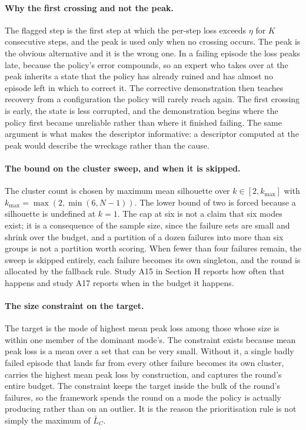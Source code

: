 \documentclass[letterpaper]{article}
\begin{document}
\paragraph{Why the first crossing and not the peak.} The flagged step is the first step
at which the per-step loss exceeds $\eta$ for $K$ consecutive steps, and the peak is
used only when no crossing occurs. The peak is the obvious alternative and it is the
wrong one. In a failing episode the loss peaks late, because the policy's error
compounds, so an expert who takes over at the peak inherits a state that the policy has
already ruined and has almost no episode left in which to correct it. The corrective
demonstration then teaches recovery from a configuration the policy will rarely reach
again. The first crossing is early, the state is less corrupted, and the demonstration
begins where the policy first became unreliable rather than where it finished failing.
The same argument is what makes the descriptor informative: a descriptor computed at
the peak would describe the wreckage rather than the cause.

\paragraph{The bound on the cluster sweep, and when it is skipped.} The cluster count is chosen
by maximum mean silhouette over $k \in [2, k_{\max}]$ with
$k_{\max} = \max(2, \min(6, N-1))$. The lower bound of two is forced because a
silhouette is undefined at $k = 1$. The cap at six is not a claim that six modes exist;
it is a consequence of the sample size, since the failure sets are small and shrink over
the budget, and a partition of a dozen failures into more than six groups is not a
partition worth scoring. When fewer than four failures remain, the sweep is skipped
entirely, each failure becomes its own singleton, and the round is allocated by the
fallback rule. Study A15 in Section H reports how often that happens and study A17
reports when in the budget it happens.

\paragraph{The size constraint on the target.} The target is the mode of highest
mean peak loss among those whose size is within one member of the dominant mode's. The
constraint exists because mean peak loss is a mean over a set that can be very small.
Without it, a single badly failed episode that lands far from every other failure
becomes its own cluster, carries the highest mean peak loss by construction, and
captures the round's entire budget. The constraint keeps the target inside the bulk of
the round's failures, so the framework spends the round on a mode the policy is
actually producing rather than on an outlier. It is the reason the prioritisation rule
is not simply the maximum of $\bar{L}_C$.
\end{document}
